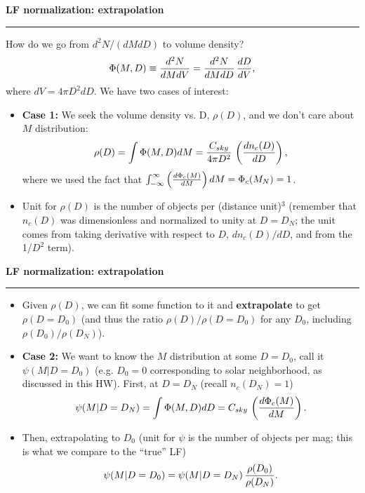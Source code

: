 \documentclass[letterpaper,landscape]{slides}
\begin{document}
 
\begin{slide}
\begin{center}
\bfseries
{\large {\color{red} LF normalization: extrapolation}}
\end{center}
\vskip 0.2in
\hrule
{\color{blue} How do we go from $d^2 N / (dM dD)$ to volume density? } 
\begin{equation}
  \Phi(M,D) \equiv  {d^2 N \over dM dV } =    {d^2 N \over dM dD }  \, {dD \over dV},
\end{equation}
where $dV = 4\pi D^2 dD$. We have two cases of interest: 
\begin{itemize}
\item {\bf Case 1:} We seek the volume density vs. D, $\rho(D)$, and we don't care about $M$ distribution:
\begin{equation}
   \rho(D) = \int \Phi(M,D) dM = {C_{sky} \over 4\pi D^2} \, \left( {d n_c(D) \over d D} \right),
\end{equation}
where we used the fact that $\int_{-\infty}^\infty  \left( {d \Phi_c(M) \over dM } \right)   dM = \Phi_c(M_N)=1$. 
\item Unit for $\rho(D)$ is the number of objects per (distance unit)$^3$ (remember that 
$n_c(D)$ was dimensionless and normalized to unity at $D=D_N$; the unit comes from 
taking derivative with respect to $D$, $d n_c(D) /d D$, and from the 1/$D^2$ term).  
\end{itemize}

\vfill
\end{slide}
 
\begin{slide}
\begin{center}
\bfseries
{\large {\color{red} LF normalization: extrapolation}}
\end{center}
\vskip 0.2in
\hrule
\begin{itemize}
\item Given $\rho(D)$, we can fit some function to it and {\bf extrapolate} to get $\rho(D=D_0)$
(and thus the ratio $\rho(D)/\rho(D=D_0)$ for any $D_0$, including $\rho(D_0)/\rho(D_N)$). 
\item {\bf Case 2:} We want to know the $M$ distribution at some $D=D_0$, call it  $\psi(M | D=D_0) $ 
(e.g. $D_0=0$ corresponding to solar neighborhood, as discussed in this HW). First, at $D=D_N$
(recall  $n_c(D_N)=1$)
\begin{equation}
   \psi(M | D=D_N) = \int \Phi(M,D) dD = C_{sky} \, \left( {d \Phi_c(M) \over dM } \right). 
\end{equation}
\item Then, extrapolating to $D_0$ (unit for $\psi$ is the number of objects per mag; this
is what we compare to the ``true'' LF)
\begin{equation}
   \psi(M | D=D_0) =  \psi(M | D=D_N) \, {\rho(D_0)  \over \rho(D_N) }.
\end{equation}
\end{itemize}

\vfill
\end{slide}
 

 





  

\end{document}
